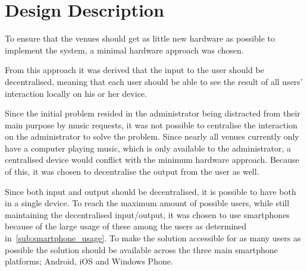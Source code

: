 \section{Design Description}
To ensure that the venues should get as little new hardware as possible to implement the system, a minimal hardware approach was chosen.

From this approach it was derived that the input to the user should be decentralised, meaning that each user should be able to see the result of all users' interaction locally on his or her device.

Since the initial problem resided in the administrator being distracted from their main purpose by music requests, it was not possible to centralise the interaction on the administrator to solve the problem. Since nearly all venues currently only have a computer playing music, which is only available to the administrator, a centralised device would conflict with the minimum hardware approach. Because of this, it was chosen to decentralise the output from the user as well.

Since both input and output should be decentralised, it is possible to have both in a single device.
To reach the maximum amount of possible users, while still maintaining the decentralised input/output, it was chosen to use smartphones because of the large usage of these among the users as determined in~\cref{sub:smartphone_usage}. To make the solution accessible for as many users as possible the solution should be available across the three main smartphone platforms; Android, iOS and Windows Phone.

